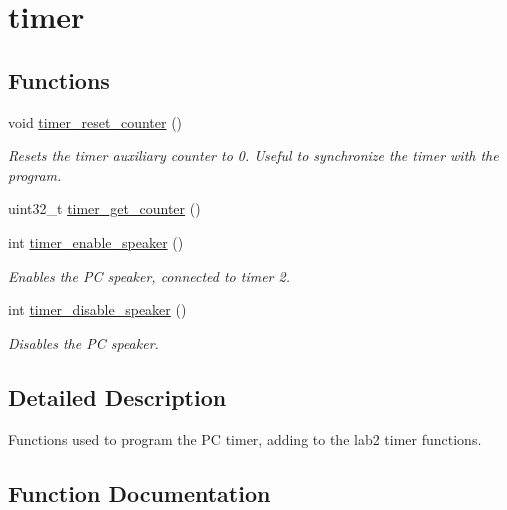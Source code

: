 \hypertarget{group__timer}{}\section{timer}
\label{group__timer}
\subsection*{Functions}
\begin{DoxyCompactItemize}
\item 
void \mbox{\hyperlink{group__timer_ga47c90b12223cd6c7dc0cabf83d41ca54}{timer\+\_\+reset\+\_\+counter}} ()
\begin{DoxyCompactList}\small\item\em Resets the timer auxiliary counter to 0. Useful to synchronize the timer with the program. \end{DoxyCompactList}\item 
uint32\+\_\+t \mbox{\hyperlink{group__timer_ga2a20f5c67ca8817f632167d0a03467dd}{timer\+\_\+get\+\_\+counter}} ()
\item 
int \mbox{\hyperlink{group__timer_ga6cfa415109f0af4e5e4aa62cdb445e4c}{timer\+\_\+enable\+\_\+speaker}} ()
\begin{DoxyCompactList}\small\item\em Enables the PC speaker, connected to timer 2. \end{DoxyCompactList}\item 
int \mbox{\hyperlink{group__timer_gaed210041d11c686eb05b82e10074ddbf}{timer\+\_\+disable\+\_\+speaker}} ()
\begin{DoxyCompactList}\small\item\em Disables the PC speaker. \end{DoxyCompactList}\end{DoxyCompactItemize}


\subsection{Detailed Description}
Functions used to program the PC timer, adding to the lab2 timer functions. 

\subsection{Function Documentation}
\mbox{\label{group__timer_gaed210041d11c686eb05b82e10074ddbf}} 
